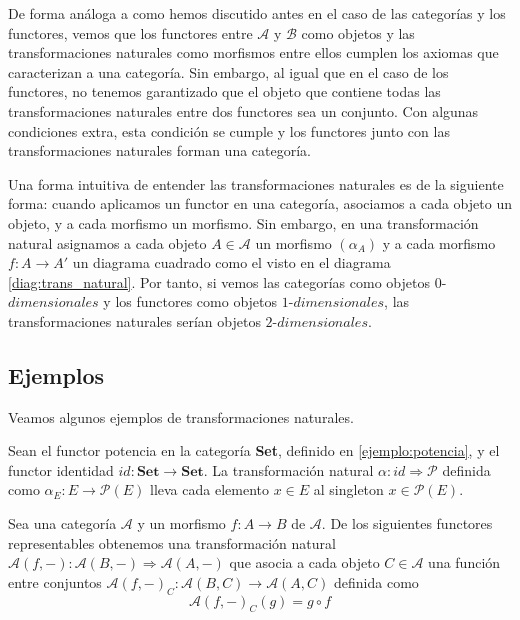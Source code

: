De forma análoga a como hemos discutido antes en el caso de las categorías y los functores, vemos que los functores entre $\mathscr{A}$ y $\mathscr{B}$ como objetos y las transformaciones naturales como morfismos entre ellos cumplen los axiomas que caracterizan a una categoría. Sin embargo, al igual que en el caso de los functores, no tenemos garantizado que el objeto que contiene todas las transformaciones naturales entre dos functores sea un conjunto. Con algunas condiciones extra, esta condición se cumple y los functores junto con las transformaciones naturales forman una categoría.

Una forma intuitiva de entender las transformaciones naturales es de la siguiente forma: cuando aplicamos un functor en una categoría, asociamos a cada objeto un objeto, y a cada morfismo un morfismo. Sin embargo, en una transformación natural asignamos a cada objeto $A \in \mathscr{A}$ un morfismo $(\alpha_{A})$ y a cada morfismo $f: A \longrightarrow A'$ un diagrama cuadrado como el visto en el diagrama \ref{diag:trans_natural}. Por tanto, si vemos las categorías como objetos $0$-$dimensionales$ y los functores como objetos $1$-$dimensionales$, las transformaciones naturales serían objetos $2$-$dimensionales$. 

\subsection{Ejemplos}
Veamos algunos ejemplos de transformaciones naturales.

\begin{ejemplo}
    Sean el functor potencia en la categoría \textbf{Set}, definido en \ref{ejemplo:potencia}, y el functor identidad $id: \textbf{Set} \longrightarrow \textbf{Set}$. La transformación natural $\alpha: id \Rightarrow \mathcal{P}$ definida como $\alpha_{E}: E \longrightarrow \mathcal{P}(E)$ lleva cada elemento $x \in E$ al singleton ${x} \in \mathcal{P}(E)$.
\end{ejemplo}

\begin{ejemplo}
    Sea una categoría $\mathscr{A}$ y un morfismo $f:A \longrightarrow B$ de $\mathscr{A}$. De los siguientes functores representables obtenemos una transformación natural $\mathscr{A}(f,-) : \mathscr{A}(B,-) \Rightarrow \mathscr{A}(A,-)$  que asocia a cada objeto $C \in \mathscr{A}$ una función entre conjuntos $\mathscr{A}(f,-)_{C}: \mathscr{A}(B,C) \longrightarrow \mathscr{A}(A,C)$ definida como \begin{equation}
        \mathscr{A}(f,-)_{C}(g) = g \circ f
    \end{equation}
\end{ejemplo}

